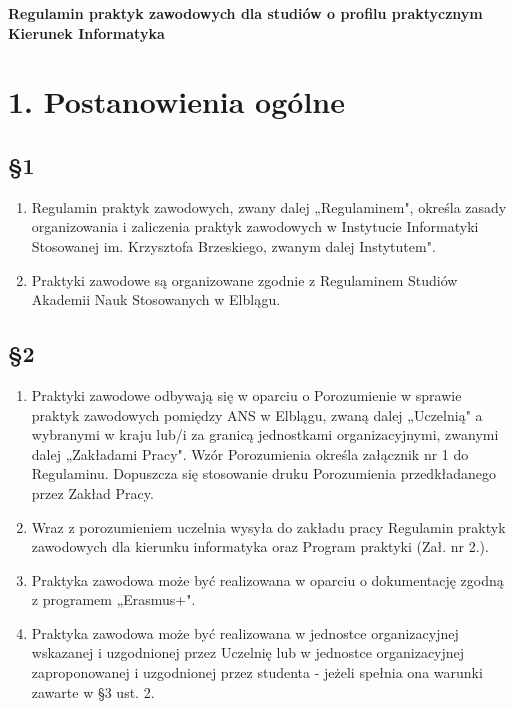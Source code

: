 \documentclass[12pt,a4paper]{article}
\begin{document}
\begin{center}
\textbf{Regulamin praktyk zawodowych dla studiów o profilu praktycznym\\Kierunek Informatyka}
\end{center}
\vspace{1em}

\section*{1. Postanowienia ogólne}

\subsection*{\S 1}
\begin{enumerate}
    \item Regulamin praktyk zawodowych, zwany dalej „Regulaminem", określa zasady organizowania i zaliczenia praktyk zawodowych w Instytucie Informatyki Stosowanej im. Krzysztofa Brzeskiego, zwanym dalej  Instytutem".
    \item Praktyki zawodowe są organizowane zgodnie z Regulaminem Studiów Akademii Nauk Stosowanych w Elblągu.
\end{enumerate}

\subsection*{\S 2}
\begin{enumerate}
    \item Praktyki zawodowe odbywają się w oparciu o Porozumienie w sprawie praktyk zawodowych pomiędzy ANS w Elblągu, zwaną dalej „Uczelnią" a wybranymi w kraju lub/i za granicą jednostkami organizacyjnymi, zwanymi dalej „Zakładami Pracy". Wzór Porozumienia określa załącznik nr 1 do Regulaminu. Dopuszcza się stosowanie druku Porozumienia przedkładanego przez Zakład Pracy.
    \item Wraz z porozumieniem uczelnia wysyła do zakładu pracy Regulamin praktyk zawodowych dla kierunku informatyka oraz Program praktyki (Zał. nr 2.).
    \item Praktyka zawodowa może być realizowana w oparciu o dokumentację zgodną z programem „Erasmus+".
    \item Praktyka zawodowa może być realizowana w jednostce organizacyjnej wskazanej i uzgodnionej przez Uczelnię lub w jednostce organizacyjnej zaproponowanej i uzgodnionej przez studenta - jeżeli spełnia ona warunki zawarte w \S 3 ust. 2.
\end{enumerate}
\end{document}
